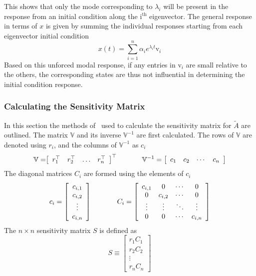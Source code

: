 This shows that only the mode corresponding to $\lambda_{i}$ will be present in the response from an initial condition along the $\mathrm{i^{th}}$ eigenvector.
The general response in terms of $x$ is given by summing the individual responses starting from each eigenvector initial condition
\begin{equation*}
  x(t)=\sum \limits_{i=1}^{n} \alpha_{i}e^{\lambda_{i}t}\mathrm{v}_{i}
\end{equation*}
Based on this unforced modal response, if any entries in $\mathrm{v}_{i}$ are small relative to the others, the corresponding states are thus not influential in determining the initial condition response.

\subsubsection*{Calculating the Sensitivity Matrix}

In this section the methods of\ \cite{durham.flightdynamics.2013, manual.durham.2002} used to calculate the sensitivity matrix for $\tilde{A}$ are outlined.
The matrix $\mathbb{V}$ and its inverse $\mathbb{V}^{-1}$ are first calculated.
The rows of $\mathbb{V}$ are denoted using $r_{i}$, and the columns of $\mathbb{V}^{-1}$ as $c_{i}$
\begin{equation*}
  \mathbb{V}=
  \bigr[
  \begin{array}{cccc}
    r_{1}^{\top} & r_{2}^{\top} & \hdots & r_{n} ^{\top}
  \end{array}\bigr]^{\top}
  \hspace{0.5in}
  \mathbb{V}^{-1}=\left[
  \begin{array}{cccc}
    c_{1} & c_{2} & \cdots & c_{n}
  \end{array}\right]
\end{equation*}
The diagonal matrices $C_{i}$ are formed using the elements of $c_{i}$
\begin{equation*}
  c_{i}=\left[
  \begin{array}{c}
    c_{i,1} \\
    c_{i,2} \\
    \vdots \\
    c_{i,n}
  \end{array}\right] \hspace{0.5in}
  C_{i}=\left[
  \begin{array}{cccc}
    c_{i,1} & 0 & \cdots & 0 \\
    0 & c_{i,2} & \cdots & 0 \\
    \vdots & \vdots & \ddots & \vdots \\
    0 & 0 & \cdots & c_{i,n}
  \end{array}\right]
\end{equation*}
The $n \times n$ sensitivity matrix $S$ is defined as
\begin{equation*}
  S\equiv\left[
  \begin{array}{c}
    r_{1}C_{1} \\
    r_{2}C_{2} \\
    \vdots \\
    r_{n}C_{n}
  \end{array}\right]
\end{equation*}

